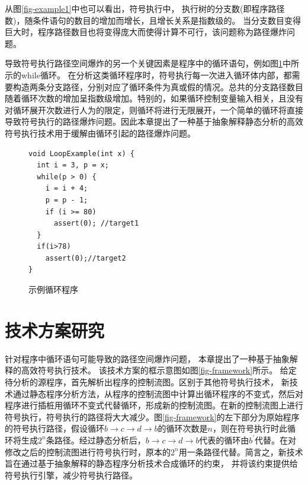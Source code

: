 从图\ref{fig-example1}中也可以看出，符号执行中，
执行树的分支数(即程序路径数)，随条件语句的数目的增加而增长，且增长关系是指数级的。
当分支数目变得巨大时，程序路径数目也将变得庞大而使得计算不可行，该问题称为路径爆炸问题。

导致符号执行路径空间爆炸的另一个关键因素是程序中的循环语句，例如图\ref{fig-example2}中所示的while循环。
在分析这类循环程序时，符号执行每一次进入循环体内部，都需要构造两条分支路径，分别对应了循环条件为真或假的情况。总共的分支路径数目随着循环次数的增加呈指数级增加。特别的，如果循环控制变量输入相关，且没有对循环展开次数进行人为的限定，则循环将进行无限展开，一个简单的循环将直接导致符号执行的路径爆炸问题。因此本章提出了一种基于抽象解释静态分析的高效符号执行技术用于缓解由循环引起的路径爆炸问题。


\begin{figure}[h]
\begin{lstlisting}
void LoopExample(int x) {
  int i = 3, p = x;
  while(p > 0) {
    i = i + 4;
    p = p - 1;
	if (i >= 80)
	  assert(0); //target1
  }
  if(i>78)
  	assert(0);//target2
}
\end{lstlisting}
\caption{示例循环程序}
\label{fig-example2}
\end{figure}

\section{技术方案研究}
针对程序中循环语句可能导致的路径空间爆炸问题，
本章提出了一种基于抽象解释的高效符号执行技术。
该技术方案的框示意图如图\ref{fig-framework}所示。
给定待分析的源程序，首先解析出程序的控制流图。区别于其他符号执行技术，
新技术通过静态程序分析方法，从程序的控制流图中计算出循环程序的不变式，然后对程序进行插桩用循环不变式代替循环，形成新的控制流图。在新的控制流图上进行符号执行，符号执行的路径将大大减少。图\ref{fig-framework}的左下部分为原始程序的符号执行路径，假设循环$b \rightarrow c \rightarrow d \rightarrow b$的循环次数是$n$，则在符号执行时此循环将生成$2^{n}$条路径。经过静态分析后，$b \rightarrow c \rightarrow d \rightarrow b$代表的循环由$b^{'}$代替。在对修改之后的控制流图进行符号执行时，原本的$2^{n}$用一条路径代替。简言之，新技术旨在通过基于抽象解释的静态程序分析技术合成循环的约束，
并将该约束提供给符号执行引擎，减少符号执行路径。

